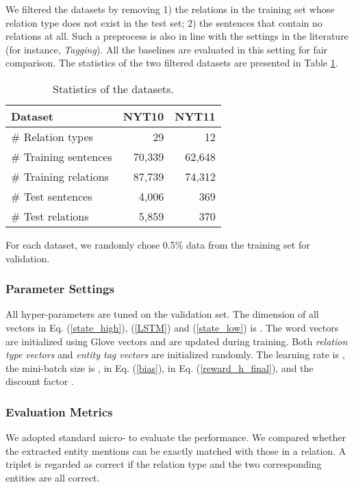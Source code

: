 \documentclass[letterpaper]{article} \usepackage{aaai19}  \usepackage{times}  \usepackage{helvet}  \usepackage{courier}  \usepackage{url}  \usepackage{graphicx}  \frenchspacing  \setlength{\pdfpagewidth}{8.5in}  \setlength{\pdfpageheight}{11in}  \usepackage{amsfonts}
\theoremstyle{definition}
\begin{document}
We filtered the datasets by removing 1) the relations in the training set whose relation type does not exist in the test set; 2) the sentences that contain no relations at all. Such a preprocess is also in line with the settings in the literature (for instance, \textit{Tagging}). All the baselines are evaluated in this setting for fair comparison. The statistics of the two filtered datasets are presented in Table \ref{datasets}.


\begin{table}[!htb]
    \centering
\begin{tabular}{lrr}\toprule
        Dataset & NYT10 & NYT11 \\\midrule
        \# Relation types & 29 & 12 \\\# Training sentences & 70,339 & 62,648 \\\# Training relations & 87,739 & 74,312 \\\# Test sentences & 4,006 & 369 \\\# Test relations & 5,859 & 370 \\\bottomrule
\end{tabular}
    \caption{Statistics of the datasets.}
    \label{datasets}
\end{table}

For each dataset, we randomly chose 0.5\% data from the training set for validation.

\subsubsection{Parameter Settings}
All hyper-parameters are tuned on the validation set. The dimension of all vectors in Eq. (\ref{state_high}), (\ref{LSTM}) and (\ref{state_low}) is . The word vectors are initialized using Glove vectors \cite{pennington2014glove} and are updated during training. Both \textit{relation type vectors} and \textit{entity tag vectors} are initialized randomly. The learning rate is , the mini-batch size is ,  in Eq. (\ref{bias}),  in Eq. (\ref{reward_h_final}), and the discount factor .

\subsubsection{Evaluation Metrics}
We adopted standard micro- to evaluate the performance. We compared whether the extracted entity mentions can be exactly matched with those in a relation.
A triplet is regarded as correct if the relation type and the two corresponding entities are all correct. 
\end{document}
